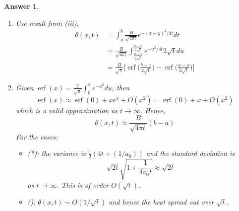 \documentclass[a4paper]{article}
\DeclareMathOperator{\erf}{erf}
\newtheorem{ans}{Answer}[section]
\theoremstyle{new}
\begin{document}
\begin{ans}
\begin{enumerate}[label=(\roman*)]
\begin{align}
\end{align}
where $\Delta x=x-x_0$ and we used the substitution $y\rightarrow y+x$. The final result is also Gaussian.
\item Use result from (iii),
\begin{align}
\theta(x,t)&=\int_a^b\frac{B}{\sqrt{4\pi t}}e^{-(x-y)^2/4t}dt\nonumber\\&=\frac{B}{\sqrt{4\pi t}}\int_{\frac{a-x}{2\sqrt{t}}}^{\frac{b-x}{2\sqrt{t}}}e^{-u^2/4t}2\sqrt{t}du\nonumber\\&=\frac{B}{\sqrt{\pi}}\bigg[\erf\bigg(\frac{b-x}{2\sqrt{t}}\bigg)-\erf\bigg(\frac{a-x}{2\sqrt{t}}\bigg)\bigg]\nonumber
\end{align}
\item 
Given $\erf(x)=\frac{2}{\sqrt{\pi}}\int_0^xe^{-u^2}du$, then
$$\erf(x)\approx\erf(0)+xe^x+O(x^2)=\erf(0)+x+O(x^2)$$
which is a valid approximation as $t\rightarrow\infty$. Hence, $$\theta(x,t)\approx\frac{B}{\sqrt{4\pi t}}(b-a)$$
For the cases:
\begin{itemize}
    \item (*): the variance is $\frac{1}{2}(4t+(1/a_0))$ and the standard deviation is
    $$\sqrt{2t}\sqrt{1+\frac{1}{4a_0t}}\approx\sqrt{2t}$$
    as $t\rightarrow\infty$. This is of order $O(\sqrt{t})$.
    \item (\dag): $\theta(x,t)\sim O(1/\sqrt{t})$ and hence the heat spread out over $\sqrt{t}$.
\end{itemize}
\end{enumerate}
\end{ans}
\newpage
\end{document}
